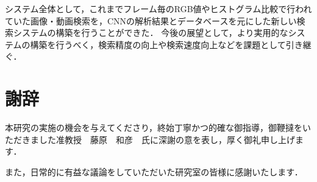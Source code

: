 \documentclass[a4j,12pt,dvipdfmx]{jreport}
\begin{document}
システム全体として，これまでフレーム毎のRGB値やヒストグラム比較で行われていた画像・動画検索を，CNNの解析結果とデータベースを元にした新しい検索システムの構築を行うことができた．
今後の展望として，より実用的なシステムの構築を行うべく，検索精度の向上や検索速度向上などを課題として引き継ぐ．

\chapter*{謝辞}
本研究の実施の機会を与えてくださり，終始丁寧かつ的確な御指導，御鞭撻をいただきました准教授　藤原　和彦　氏に深謝の意を表し，厚く御礼申し上げます．\par
また，日常的に有益な議論をしていただいた研究室の皆様に感謝いたします．

\clearpage




\end{document}
